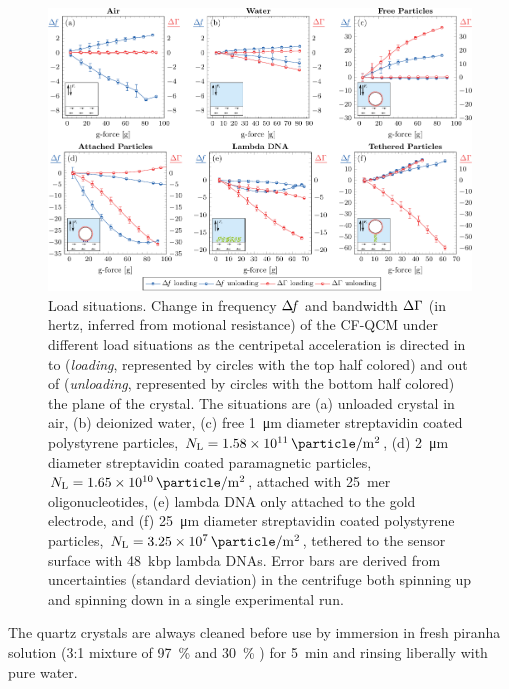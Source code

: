 \begin{figure}[ht]
\centering
\includegraphics[width=16cm,keepaspectratio]{qcm/figures/figure2.pdf}
\caption{Load situations.
Change in frequency $\Delta\!f$ and bandwidth $\Delta\Gamma$
(in hertz, inferred from motional resistance) of
the CF-QCM under different load situations as the centripetal acceleration
is directed in to (\textit{loading}, represented by circles with the top half
colored) and out of (\textit{unloading}, represented by circles with the
bottom half colored) the plane of the crystal.
The situations are 
(a) unloaded crystal in air, 
(b) deionized water, 
(c) free \SI{1}{\micro\meter} diameter streptavidin coated polystyrene
particles, $N_\mathrm{L}=\SI{1.58e11}{\particle\per\meter\squared}$,
(d) \SI{2}{\micro\meter} diameter streptavidin coated paramagnetic
particles, $N_\mathrm{L}=\SI{1.65e10}{\particle\per\meter\squared}$,
attached with \SI{25}{mer} oligonucleotides, 
(e) lambda DNA only attached to the gold electrode, and
(f) \SI{25}{\micro\meter} diameter streptavidin
coated polystyrene particles,
$N_\mathrm{L}=\SI{3.25e7}{\particle\per\meter\squared}$, tethered to the sensor surface with
\SI{48}{kbp} lambda DNAs.  Error bars are derived from uncertainties
(standard deviation) in
the centrifuge both spinning up and spinning down in a single experimental
run.
} 
\label{fig:loadplot}
\end{figure}
The quartz crystals are always cleaned before use by immersion
in fresh piranha solution (3:1 mixture of \SI{97}{\percent}  and
\SI{30}{\percent} ) for \SI{5}{\minute} and rinsing liberally with
pure water.

